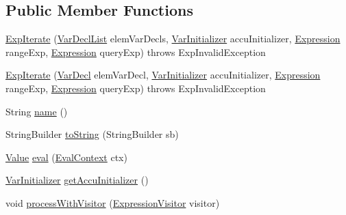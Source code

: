 \subsection*{Public Member Functions}
\begin{DoxyCompactItemize}
\item 
\hyperlink{classorg_1_1tzi_1_1use_1_1uml_1_1ocl_1_1expr_1_1_exp_iterate_aeae955ec137b12a9604e13ff338ea5c4}{Exp\-Iterate} (\hyperlink{classorg_1_1tzi_1_1use_1_1uml_1_1ocl_1_1expr_1_1_var_decl_list}{Var\-Decl\-List} elem\-Var\-Decls, \hyperlink{classorg_1_1tzi_1_1use_1_1uml_1_1ocl_1_1expr_1_1_var_initializer}{Var\-Initializer} accu\-Initializer, \hyperlink{classorg_1_1tzi_1_1use_1_1uml_1_1ocl_1_1expr_1_1_expression}{Expression} range\-Exp, \hyperlink{classorg_1_1tzi_1_1use_1_1uml_1_1ocl_1_1expr_1_1_expression}{Expression} query\-Exp)  throws Exp\-Invalid\-Exception     
\item 
\hyperlink{classorg_1_1tzi_1_1use_1_1uml_1_1ocl_1_1expr_1_1_exp_iterate_ada3cce199cacc495e116e34b5c0b798d}{Exp\-Iterate} (\hyperlink{classorg_1_1tzi_1_1use_1_1uml_1_1ocl_1_1expr_1_1_var_decl}{Var\-Decl} elem\-Var\-Decl, \hyperlink{classorg_1_1tzi_1_1use_1_1uml_1_1ocl_1_1expr_1_1_var_initializer}{Var\-Initializer} accu\-Initializer, \hyperlink{classorg_1_1tzi_1_1use_1_1uml_1_1ocl_1_1expr_1_1_expression}{Expression} range\-Exp, \hyperlink{classorg_1_1tzi_1_1use_1_1uml_1_1ocl_1_1expr_1_1_expression}{Expression} query\-Exp)  throws Exp\-Invalid\-Exception     
\item 
String \hyperlink{classorg_1_1tzi_1_1use_1_1uml_1_1ocl_1_1expr_1_1_exp_iterate_ad643557d4669e55a52aeee6bad4c6d5b}{name} ()
\item 
String\-Builder \hyperlink{classorg_1_1tzi_1_1use_1_1uml_1_1ocl_1_1expr_1_1_exp_iterate_a1dd74a82162c60f9ff8397674ffa7a48}{to\-String} (String\-Builder sb)
\item 
\hyperlink{classorg_1_1tzi_1_1use_1_1uml_1_1ocl_1_1value_1_1_value}{Value} \hyperlink{classorg_1_1tzi_1_1use_1_1uml_1_1ocl_1_1expr_1_1_exp_iterate_a92358fe3f9806a5879e78858edaf55d8}{eval} (\hyperlink{classorg_1_1tzi_1_1use_1_1uml_1_1ocl_1_1expr_1_1_eval_context}{Eval\-Context} ctx)
\item 
\hyperlink{classorg_1_1tzi_1_1use_1_1uml_1_1ocl_1_1expr_1_1_var_initializer}{Var\-Initializer} \hyperlink{classorg_1_1tzi_1_1use_1_1uml_1_1ocl_1_1expr_1_1_exp_iterate_a870fa0f0bf602135ca5edb98d350fc5f}{get\-Accu\-Initializer} ()
\item 
void \hyperlink{classorg_1_1tzi_1_1use_1_1uml_1_1ocl_1_1expr_1_1_exp_iterate_a06fd910527e27150e44ddb22f2a16dcf}{process\-With\-Visitor} (\hyperlink{interfaceorg_1_1tzi_1_1use_1_1uml_1_1ocl_1_1expr_1_1_expression_visitor}{Expression\-Visitor} visitor)
\end{DoxyCompactItemize}
